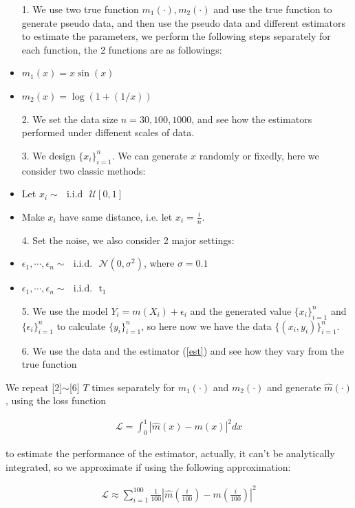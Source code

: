 \documentclass[twoside]{article}
\begin{document}
\begin{itemize}
  \item[1.] We use two true function $m_1(\cdot),m_2(\cdot)$ and use the true function to generate pseudo data, and then use the pseudo data and different estimators to estimate the parameters, we perform the following steps separately for each function, the 2 functions are as followings:
        \item $m_1(x)=x\sin(x)$
        \item $m_2(x)=\log(1+(1/x))$
  \item[2.] We set the data size $n=30, 100, 1000$, and see how the estimators performed under diffenent scales of data.
  \item[3.] We design $\{x_i\}_{i=1}^n$. We can generate $x$ randomly or fixedly, here we consider two classic methods:
        \item Let $x_i \sim\text{ }\mathrm{i.i.d}\textbf{ }\mathcal{U}[0, 1]$
        \item Make $x_i$ have same distance, i.e. let $x_i = \frac{i}{n}$.
  \item[4.] Set the noise, we also consider 2 major settings:
        \item $\epsilon_1, \cdots, \epsilon_n \sim\text{ }\mathrm{i.i.d.} \text{ }\mathcal{N}(0,\sigma^2)$, where $\sigma=0.1$
        \item $\epsilon_1, \cdots, \epsilon_n \sim\text{ }\mathrm{i.i.d.} \text{ }\mathrm{t}_1$
  \item[5.] We use the model $Y_i=m(X_i) + \epsilon_i$ and the generated value $\{x_i\}_{i=1}^n$ and $\{\epsilon_i\}_{i=1}^n$ to calculate $\{y_i\}_{i=1}^n$, so here now we have the data $\{(x_i,y_i)\}_{i=1}^n$.
  \item[6.] We use the data and the estimator (\ref{est}) and see how they vary from the true function
\end{itemize}

We repeat [2]$\sim$[6] $T$ times separately for $m_1(\cdot)$ and $m_2(\cdot)$ and generate $\hat{m}(\cdot)$, using the loss function

\begin{eqnarray}
  \mathcal{L} = \int_{0}^{1}{|\hat{m}(x)-m(x)|^2 dx}
\end{eqnarray}

to estimate the performance of the estimator, actually, it can't be analytically integrated, so we approximate if using the following approximation:

\begin{eqnarray}
\label{lossf}
  \mathcal{L} \approx \sum_{i=1}^{100}{\frac{1}{100}|\hat{m}(\frac{i}{100})-m(\frac{i}{100})|^2}
\end{eqnarray}
\end{document}
